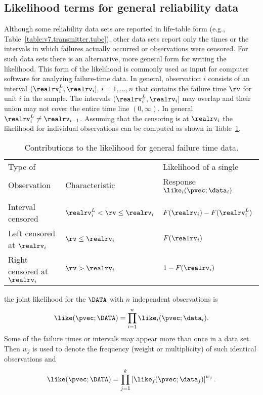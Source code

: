 \subsection{Likelihood terms for general reliability data}
\label{section:general.likelihood.terms}
Although some reliability data sets are reported in life-table form
(e.g., Table~\ref{table:v7.transmitter.tube}),
other data sets report only the times or the intervals in which failures
actually occurred or observations were censored.  For such data sets
there is an alternative, more general form for writing the likelihood.
This form of the likelihood is commonly used as input for computer
software for analyzing failure-time data.  In general, 
observation $i$ consists of an interval $(\realrv_{i}^{L},\realrv_{i}]$,
$i=1, \ldots, n$ that contains the failure
time $\rv$ for unit $i$ in the sample. The intervals
$(\realrv_{i}^{L},\realrv_{i}]$ may overlap and their union may not
cover the entire time line $(0, \infty)$. In general $\realrv_{i}^{L}
\ne \realrv_{i-1}$. Assuming that the censoring is at $\realrv_{i}$
the likelihood for individual observations can be computed as shown in
Table~\ref{table:general.likelihood.terms},
\begin{table}
\caption{Contributions to the likelihood for general failure time data.}
\centering\small
\begin{tabular}{lll} 
\\[-.5ex]
Type of   &                  &  Likelihood of  a single
\\ 
Observation & Characteristic & Response $\like_{i}(\pvec;\data_{i})$
\\ \hline
\\
Interval censored & $\realrv_{i}^{L} < \rv \le
\realrv_{i}$&
$F(\realrv_{i})-F(\realrv_{i}^{L})$ \\[1ex]
 Left censored at $\realrv_{i}$ & $\rv \le
\realrv_{i}$ &$ F(\realrv_{i})$ 
\\[1ex]
Right censored at $\realrv_{i}$ & $\rv > \realrv_{i}$& 
$1-F(\realrv_{i}) $ \\[1ex]
\hline
\end{tabular}
\label{table:general.likelihood.terms}
\end{table}
the joint likelihood for the $\DATA$
with $n$ independent observations is
\begin{displaymath}
\like(\pvec;\DATA)=
\prod_{i=1}^{n}  \like_{i}(\pvec;\data_{i}).
\end{displaymath}
Some of the failure times or intervals may appear more than once
in a data set. Then
$w_{j}$ is used to denote the frequency (weight or multiplicity) of
such identical observations and
\begin{equation}
\label{equation:like.group.censoring}
\like(\pvec;\DATA)=
\prod_{j=1}^{k} \left[\like_{j} (\pvec;\data_{j})\right]^{w_{j}}.
\end{equation}


